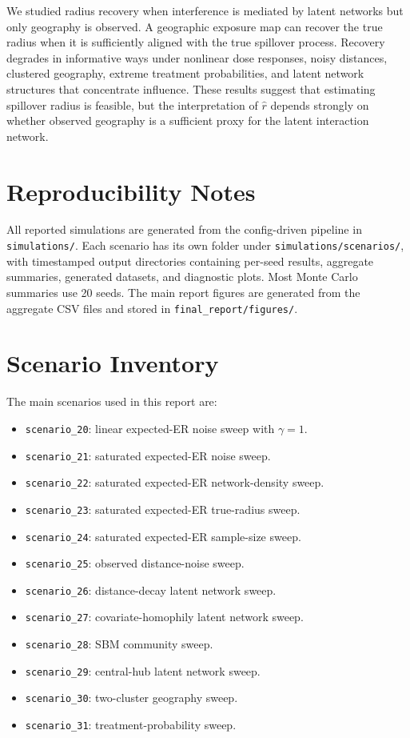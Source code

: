 \documentclass[11pt]{article}
\begin{document}
We studied radius recovery when interference is mediated by latent networks but only geography is observed. A geographic exposure map can recover the true radius when it is sufficiently aligned with the true spillover process. Recovery degrades in informative ways under nonlinear dose responses, noisy distances, clustered geography, extreme treatment probabilities, and latent network structures that concentrate influence. These results suggest that estimating spillover radius is feasible, but the interpretation of $\hat r$ depends strongly on whether observed geography is a sufficient proxy for the latent interaction network.

\appendix

\section{Reproducibility Notes}

All reported simulations are generated from the config-driven pipeline in \texttt{simulations/}. Each scenario has its own folder under \texttt{simulations/scenarios/}, with timestamped output directories containing per-seed results, aggregate summaries, generated datasets, and diagnostic plots. Most Monte Carlo summaries use 20 seeds. The main report figures are generated from the aggregate CSV files and stored in \texttt{final\_report/figures/}.

\section{Scenario Inventory}

The main scenarios used in this report are:
\begin{itemize}[leftmargin=1.25em]
    \item \texttt{scenario\_20}: linear expected-ER noise sweep with $\gamma=1$.
    \item \texttt{scenario\_21}: saturated expected-ER noise sweep.
    \item \texttt{scenario\_22}: saturated expected-ER network-density sweep.
    \item \texttt{scenario\_23}: saturated expected-ER true-radius sweep.
    \item \texttt{scenario\_24}: saturated expected-ER sample-size sweep.
    \item \texttt{scenario\_25}: observed distance-noise sweep.
    \item \texttt{scenario\_26}: distance-decay latent network sweep.
    \item \texttt{scenario\_27}: covariate-homophily latent network sweep.
    \item \texttt{scenario\_28}: SBM community sweep.
    \item \texttt{scenario\_29}: central-hub latent network sweep.
    \item \texttt{scenario\_30}: two-cluster geography sweep.
    \item \texttt{scenario\_31}: treatment-probability sweep.
\end{itemize}
\end{document}
